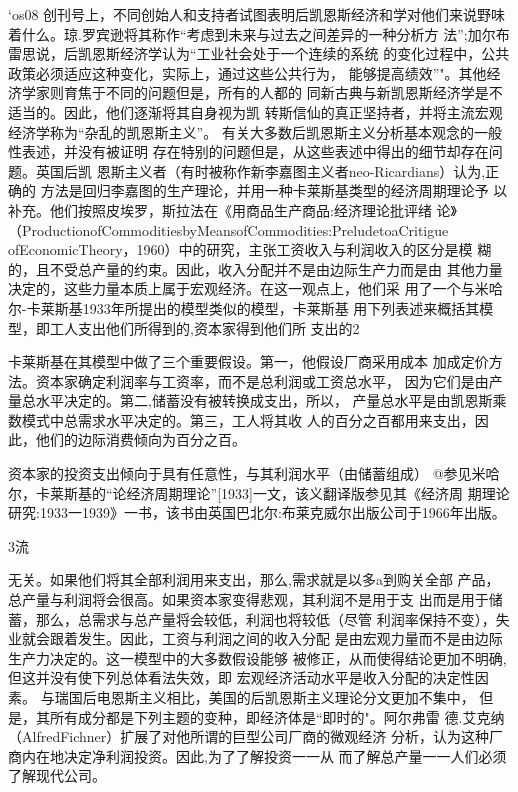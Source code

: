 ‘os08
创刊号上，不同创始人和支持者试图表明后凯恩斯经济和学对他们来说野味
着什么。琼.罗宾逊将其称作“考虑到未来与过去之间差异的一种分析方
法”;加尔布雷思说，后凯恩斯经济学认为“工业社会处于一个连续的系统
的变化过程中，公共政策必须适应这种变化，实际上，通过这些公共行为，
能够提高绩效”"。其他经济学家则育焦于不同的问题但是，所有的人都的
同新古典与新凯恩斯经济学是不适当的。因此，他们逐渐将其自身视为凯
转斯信仙的真正坚持者，并将主流宏观经济学称为“杂乱的凯恩斯主义”。
有关大多数后凯恩斯主义分析基本观念的一般性表述，并没有被证明
存在特别的问题但是，从这些表述中得出的细节却存在问题。英国后凯
恩斯主义者（有时被称作新李嘉图主义者neo-Ricardians）认为,正确的
方法是回归李嘉图的生产理论，并用一种卡莱斯基类型的经济周期理论予
以补充。他们按照皮埃罗，斯拉法在《用商品生产商品:经济理论批评绪
论》（ProductionofCommoditiesbyMeansofCommodities:PreludetoaCritigue
ofEconomicTheory，1960）中的研究，主张工资收入与利润收入的区分是模
糊的，且不受总产量的约束。因此，收入分配并不是由边际生产力而是由
其他力量决定的，这些力量本质上属于宏观经济。在这一观点上，他们采
用了一个与米哈尔-卡莱斯基1933年所提出的模型类似的模型，卡莱斯基
用下列表述来概括其模型，即工人支出他们所得到的,资本家得到他们所
支出的2

卡莱斯基在其模型中做了三个重要假设。第一，他假设厂商采用成本
加成定价方法。资本家确定利润率与工资率，而不是总利润或工资总水平，
因为它们是由产量总水平决定的。第二,储蓄没有被转换成支出，所以，
产量总水平是由凯恩斯乘数模式中总需求水平决定的。第三，工人将其收
人的百分之百都用来支出，因此，他们的边际消费倾向为百分之百。

资本家的投资支出倾向于具有任意性，与其利润水平（由储蓄组成）
@参见米哈尔，卡莱斯基的“论经济周期理论”[1933]一文，该义翻译版参见其《经济周
期理论研究:1933一1939》一书，该书由英国巴北尔:布莱克威尔出版公司于1966年出版。

3流


无关。如果他们将其全部利润用来支出，那么,需求就是以多a到购关全部
产品，总产量与利润将会很高。如果资本家变得悲观，其利润不是用于支
出而是用于储蓄，那么，总需求与总产量将会较低，利润也将较低（尽管
利润率保持不变），失业就会跟着发生。因此，工资与利润之间的收入分配
是由宏观力量而不是由边际生产力决定的。这一模型中的大多数假设能够
被修正，从而使得结论更加不明确,但这并没有使下列总体看法失效，即
宏观经济活动水平是收入分配的决定性因素。
与瑞国后电恩斯主义相比，美国的后凯恩斯主义理论分文更加不集中，
但是，其所有成分都是下列主题的变种，即经济体是“即时的"。阿尔弗雷
德.艾克纳（AlfredFichner）扩展了对他所谓的巨型公司厂商的微观经济
分析，认为这种厂商内在地决定净利润投资。因此,为了了解投资一一从
而了解总产量一一人们必须了解现代公司。


